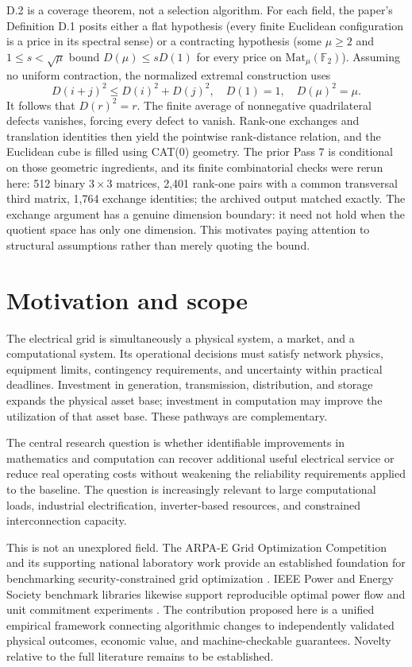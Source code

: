 \documentclass[11pt,letterpaper]{article}
\begin{document}
D.2 is a coverage theorem, not a selection algorithm. For each field, the paper's Definition D.1 posits either a flat hypothesis (every finite Euclidean configuration is a price in its spectral sense) or a contracting hypothesis (some $\mu\ge2$ and $1\le s<\sqrt\mu$ bound $D(\mu)\le sD(1)$ for every price on $\mathrm{Mat}_\mu(\mathbb F_2)$). Assuming no uniform contraction, the normalized extremal construction uses
\[
D(i+j)^2\le D(i)^2+D(j)^2,\quad D(1)=1,\quad D(\mu)^2=\mu.
\]
It follows that $D(r)^2=r$. The finite average of nonnegative quadrilateral defects vanishes, forcing every defect to vanish. Rank-one exchanges and translation identities then yield the pointwise rank-distance relation, and the Euclidean cube is filled using CAT(0) geometry. The prior Pass 7 is conditional on those geometric ingredients, and its finite combinatorial checks were rerun here: 512 binary $3\times3$ matrices, 2,401 rank-one pairs with a common transversal third matrix, 1,764 exchange identities; the archived output matched exactly. The exchange argument has a genuine dimension boundary: it need not hold when the quotient space has only one dimension. This motivates paying attention to structural assumptions rather than merely quoting the bound.

\section{Motivation and scope}
The electrical grid is simultaneously a physical system, a market, and a computational system. Its operational decisions must satisfy network physics, equipment limits, contingency requirements, and uncertainty within practical deadlines. Investment in generation, transmission, distribution, and storage expands the physical asset base; investment in computation may improve the utilization of that asset base. These pathways are complementary.

The central research question is whether identifiable improvements in mathematics and computation can recover additional useful electrical service or reduce real operating costs without weakening the reliability requirements applied to the baseline. The question is increasingly relevant to large computational loads, industrial electrification, inverter-based resources, and constrained interconnection capacity.

This is not an unexplored field. The ARPA-E Grid Optimization Competition and its supporting national laboratory work provide an established foundation for benchmarking security-constrained grid optimization \cite{go}. IEEE Power and Energy Society benchmark libraries likewise support reproducible optimal power flow and unit commitment experiments \cite{pglibopf,pglibuc}. The contribution proposed here is a unified empirical framework connecting algorithmic changes to independently validated physical outcomes, economic value, and machine-checkable guarantees. Novelty relative to the full literature remains to be established.
\end{document}
